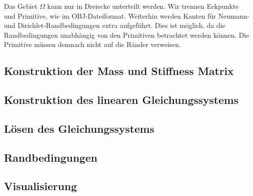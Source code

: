 \documentclass[crop=false,10pt,ngerman]{standalone}
\begin{document}
      Das Gebiet $\Omega$ kann nur in Dreiecke unterteilt werden.
      Wir trennen Eckpunkte und Primitive, wie im OBJ-Dateiformat.
      Weiterhin werden Kanten für Neumann- und Dirichlet-Randbedingungen extra aufgeführt.
      Dies ist möglich, da die Randbedingungen unabhängig von den Primitiven betrachtet werden können.
      Die Primitive müssen demnach nicht auf die Ränder verweisen.
      \cite{Alberty1998}

    \subsection{Konstruktion der Mass und Stiffness Matrix} %
    \label{sub:konstruktion_der_mass_und_stiffness_matrix}


    \subsection{Konstruktion des linearen Gleichungssystems} %
    \label{sub:konstruktion_des_linearen_gleichungssystems}


    \subsection{Lösen des Gleichungssystems} %
    \label{sub:lösen_des_gleichungssystems}


    \subsection{Randbedingungen} %
    \label{sub:randbedingungen}


    \subsection{Visualisierung} %
    \label{sub:visualisierung}

\end{document}
